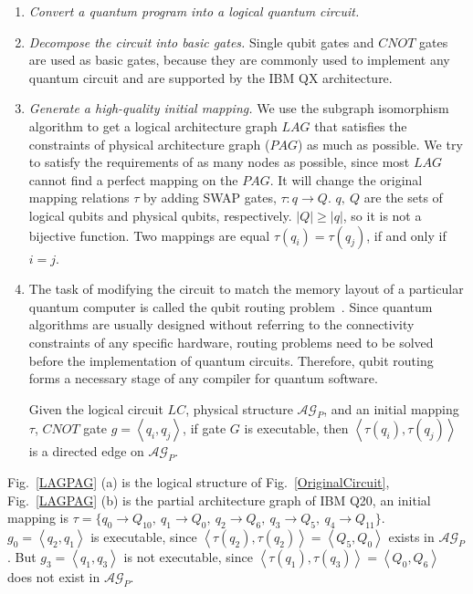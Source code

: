 \documentclass[runningheads]{llncs}
\begin{document}
\begin{enumerate}
	\item \emph{Convert a quantum program into a logical quantum circuit.}
	\item \emph{Decompose the circuit into basic gates.} 
	Single qubit gates and $CNOT$ gates are used as basic gates, 
	because they are commonly used to implement any quantum circuit 
	and are supported by the IBM QX architecture.
	\item \emph{Generate a high-quality initial mapping.} 
	We use the subgraph isomorphism 
	algorithm to get a logical architecture graph $LAG$ that satisfies 
	the constraints of physical architecture graph ($PAG$) as much as possible. 
	We try to satisfy the requirements of as many nodes as possible, since most 
	$LAG$ cannot find a perfect mapping 
	on the $PAG$.
	It will change the original mapping relations $\tau$ by adding SWAP gates, $\tau:q \rightarrow Q $. 
	$q,\ Q$ are the sets of logical qubits and physical qubits, respectively.
	$|Q| \geq |q|$, so it is not a bijective function.
	Two mappings are equal $\tau(q_{i})=\tau(q_{j})$, if and only if $i=j$.
	\item The task of modifying the circuit to match the memory layout of 
	a particular quantum computer is called the qubit routing problem~\cite{Cowtan2019}. 
	Since quantum algorithms are usually designed without referring to 
	the connectivity constraints of any specific hardware, routing problems 
	need to be solved before the implementation of quantum circuits. 
	Therefore, qubit routing forms a necessary stage of any compiler 
	for quantum software.

	Given the logical circuit $LC$, physical structure $\mathcal{AG}_{P}$, 
	and an initial mapping $\tau$, $CNOT$ gate $g=\left \langle q_{i},q_{j}\right \rangle $, 
	if gate $G$ is executable, then $\left \langle\tau(q_{i}),\tau(q_{j})\right \rangle $ 
	is a directed edge on $\mathcal{AG}_{P}$.
\end{enumerate}
\begin{example}
	Fig.~\ref{LAGPAG} (a) is the logical structure of Fig.~\ref{OriginalCircuit}, 
	Fig.~\ref{LAGPAG} (b) is the partial architecture graph of IBM Q20, an initial mapping is 
	$\tau=\{q_{0}\rightarrow  Q_{10},\ q_{1}\rightarrow Q_{0},\ 
			q_{2}\rightarrow  Q_{6},\ q_{3}\rightarrow  Q_{5},\ q_{4}\rightarrow  Q_{11}\}$.
			$g_{0}=\left \langle q_{2},q_{1}\right \rangle $ is executable, since 
			$\left \langle \tau(q_{2}),\tau(q_{2})\right \rangle =\left \langle Q_{5},Q_{0}\right \rangle $ exists in $\mathcal{AG}_{P}$.
	But $g_{3}=\left \langle q_{1},q_{3}\right \rangle $ is not executable, since 
	$\left \langle \tau(q_{1}),\tau(q_{3})\right \rangle =\left \langle Q_{0},Q_{6}\right \rangle $  does not exist in $\mathcal{AG}_{P}$.
\end{example}
\end{document}
